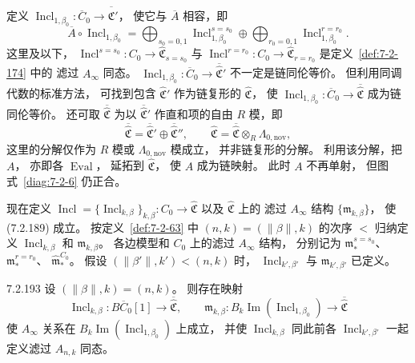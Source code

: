 定义 $\operatorname{Incl}_{1,\beta_0}\colon
\overline C_0\to
\overline{\widehat{\mathfrak C}}'$，
使它与 $\overline A$ 相容，即
\[
\overline A\circ\operatorname{Incl}_{1,\beta_0}
=\bigoplus_{s_0=0,1}
\operatorname{Incl}^{s=s_0}_{1,\beta_0}
\oplus
\bigoplus_{r_0=0,1}
\operatorname{Incl}^{r=r_0}_{1,\beta_0}.
\]
这里及以下，
$\operatorname{Incl}^{s=s_0}\colon C_0\to
\widehat{\mathfrak C}_{s=s_0}$
与
$\operatorname{Incl}^{r=r_0}\colon C_0\to
\widehat{\mathfrak C}_{r=r_0}$
是定义~\ref{def:7-2-174} 中的
滤过 $A_\infty$ 同态。
$\operatorname{Incl}_{1,\beta_0}\colon
\overline C_0\to
\overline{\widehat{\mathfrak C}}'$
不一定是链同伦等价。
但利用同调代数的标准方法，
可找到包含 $\widehat{\mathfrak C}'$
作为链复形的 $\widehat{\mathfrak C}$，
使
$\operatorname{Incl}_{1,\beta_0}\colon
\overline C_0\to
\overline{\widehat{\mathfrak C}}$
成为链同伦等价。
还可取 $\overline{\widehat{\mathfrak C}}$
为以 $\overline{\widehat{\mathfrak C}}'$
作直和项的自由 $R$ 模，即
\[
\overline{\widehat{\mathfrak C}}
=\overline{\widehat{\mathfrak C}}'
\oplus\overline{\widehat{\mathfrak C}}'',
\qquad
\widehat{\mathfrak C}
=\overline{\widehat{\mathfrak C}}
\otimes_R\Lambda_{0,\mathrm{nov}},
\]
这里的分解仅作为 $R$ 模或
$\Lambda_{0,\mathrm{nov}}$ 模成立，
并非链复形的分解。
利用该分解，把 $A$，
亦即各 $\operatorname{Eval}$，
延拓到 $\widehat{\mathfrak C}$，
使 $A$ 成为链映射。
此时 $A$ 不再单射，
但图式~\ref{diag:7-2-6} 仍正合。

现在定义
$\operatorname{Incl}=\{\operatorname{Incl}_{k,\beta}\}_{k,\beta}
\colon C_0\to\widehat{\mathfrak C}$
以及 $\widehat{\mathfrak C}$ 上的
滤过 $A_\infty$ 结构
$\{\mathfrak m_{k,\beta}\}$，
使 (7.2.189) 成立。
按定义~\ref{def:7-2-63} 中
$(n,k)=(\lVert\beta\rVert,k)$ 的次序 $<$
归纳定义 $\operatorname{Incl}_{k,\beta}$
和 $\mathfrak m_{k,\beta}$。
各边模型和 $C_0$ 上的滤过
$A_\infty$ 结构，
分别记为 $\mathfrak m_*^{s=s_0}$、
$\mathfrak m_*^{r=r_0}$、
$\widehat{\mathfrak m}_*^{C_0}$。
假设 $(\lVert\beta'\rVert,k')<(n,k)$ 时，
$\operatorname{Incl}_{k',\beta'}$
与 $\mathfrak m_{k',\beta'}$
已定义。

\begin{lemma}{7.2.193}\label{lem:7-2-193}
设 $(\lVert\beta\rVert,k)=(n,k)$。
则存在映射
\[
\operatorname{Incl}_{k,\beta}\colon
B\overline C_0[1]\longrightarrow
\overline{\widehat{\mathfrak C}},
\qquad
\mathfrak m_{k,\beta}\colon
B_k\operatorname{Im}
(\operatorname{Incl}_{1,\beta_0})
\longrightarrow
\overline{\widehat{\mathfrak C}}
\]
使 $A_\infty$ 关系在
$B_k\operatorname{Im}
(\operatorname{Incl}_{1,\beta_0})$ 上成立，
并使 $\operatorname{Incl}_{k,\beta}$
同此前各 $\operatorname{Incl}_{k',\beta'}$
一起定义滤过 $A_{n,k}$ 同态。
\end{lemma}

